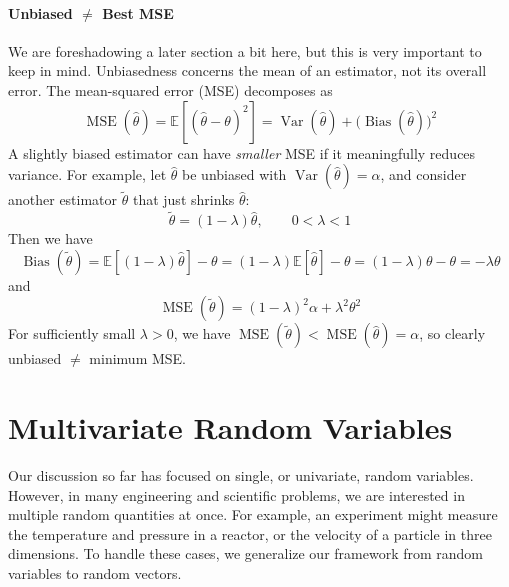 \paragraph*{Unbiased \texorpdfstring{$\neq$}{≠} Best MSE} We are foreshadowing a later section a bit here, but this is very important to keep in mind. Unbiasedness concerns the mean of an estimator, not its overall error. The mean-squared error (MSE) decomposes as
\begin{equation}
    \operatorname{MSE}(\hat\theta)
    = \mathbb{E}\!\left[(\hat\theta-\theta)^2\right]
    = \operatorname{Var}(\hat\theta) + \bigl(\operatorname{Bias}(\hat\theta)\bigr)^2
\end{equation}
A slightly biased estimator can have \emph{smaller} MSE if it meaningfully reduces variance. For example, let $\hat\theta$ be unbiased with $\operatorname{Var}(\hat\theta)=\alpha$, and consider another estimator $\tilde\theta$ that just shrinks $\hat\theta$:
\begin{equation}
    \tilde\theta=(1-\lambda)\hat\theta,\qquad 0<\lambda<1
\end{equation}
Then we have
\begin{equation}
    \operatorname{Bias}(\tilde\theta)
    = \mathbb{E}[(1-\lambda)\hat\theta] - \theta
    = (1-\lambda)\mathbb{E}[\hat\theta] - \theta
    = (1-\lambda)\theta - \theta
    = -\lambda\theta
\end{equation}
and
\begin{equation}
    \operatorname{MSE}(\tilde\theta)
    = (1-\lambda)^2 \alpha + \lambda^2 \theta^2
\end{equation}
For sufficiently small $\lambda>0$, we have $\operatorname{MSE}(\tilde\theta) < \operatorname{MSE}(\hat\theta)=\alpha$, so clearly unbiased $\neq$ minimum MSE.


\section{Multivariate Random Variables}
Our discussion so far has focused on single, or univariate, random variables. However, in many engineering and scientific problems, we are interested in multiple random quantities at once. For example, an experiment might measure the temperature and pressure in a reactor, or the velocity of a particle in three dimensions. To handle these cases, we generalize our framework from random variables to random vectors.

